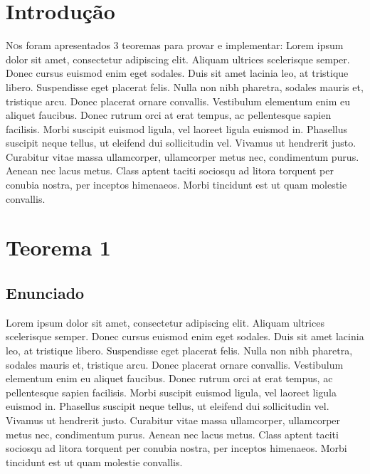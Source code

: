 \documentclass[twoside]{article}
\begin{document}
\begin{multicols}{2} %

\section{Introdução}

\lettrine[nindent=0em,lines=3]{N}os foram apresentados 3 teoremas para provar e implementar: Lorem ipsum dolor sit amet, consectetur adipiscing elit. Aliquam ultrices scelerisque semper. Donec cursus euismod enim eget sodales. Duis sit amet lacinia leo, at tristique libero. Suspendisse eget placerat felis. Nulla non nibh pharetra, sodales mauris et, tristique arcu. Donec placerat ornare convallis. Vestibulum elementum enim eu aliquet faucibus. Donec rutrum orci at erat tempus, ac pellentesque sapien facilisis. Morbi suscipit euismod ligula, vel laoreet ligula euismod in. Phasellus suscipit neque tellus, ut eleifend dui sollicitudin vel. Vivamus ut hendrerit justo. Curabitur vitae massa ullamcorper, ullamcorper metus nec, condimentum purus. Aenean nec lacus metus. Class aptent taciti sociosqu ad litora torquent per conubia nostra, per inceptos himenaeos. Morbi tincidunt est ut quam molestie convallis.



\section{Teorema 1}

\subsection{ Enunciado }
\indent Lorem ipsum dolor sit amet, consectetur adipiscing elit. Aliquam ultrices scelerisque semper. Donec cursus euismod enim eget sodales. Duis sit amet lacinia leo, at tristique libero. Suspendisse eget placerat felis. Nulla non nibh pharetra, sodales mauris et, tristique arcu. Donec placerat ornare convallis. Vestibulum elementum enim eu aliquet faucibus. Donec rutrum orci at erat tempus, ac pellentesque sapien facilisis. Morbi suscipit euismod ligula, vel laoreet ligula euismod in. Phasellus suscipit neque tellus, ut eleifend dui sollicitudin vel. Vivamus ut hendrerit justo. Curabitur vitae massa ullamcorper, ullamcorper metus nec, condimentum purus. Aenean nec lacus metus. Class aptent taciti sociosqu ad litora torquent per conubia nostra, per inceptos himenaeos. Morbi tincidunt est ut quam molestie convallis.




\end{multicols}
\end{document}

